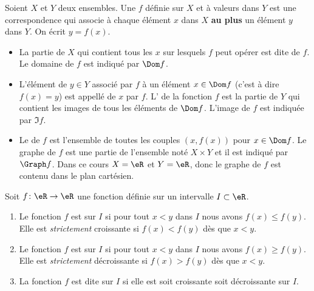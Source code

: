 \begin{definition}
  Soient $X$ et $Y$ deux ensembles. Une  $f$ définie sur $X$ et à valeurs dans $Y$ est une correspondence qui associe à chaque élément $x$ dans $X$ {\bf au plus} un élément $y$ dans $Y$. On écrit $y= f(x)$.
  \begin{itemize}
  \item La partie de $X$ qui contient tous les $x$ sur lesquels $f$ peut opérer est dite  de $f$. Le domaine de $f$ est indiqué par $\Dom f$.
  \item L'élément de $y\in Y$ associé par $f$ à un élément $x\in \Dom f$ (c'est à dire $f(x) = y$)  est appellé  de $x$ par $f$. L' de la fonction $f$ est la partie de $Y$ qui contient les images de tous les éléments de $\Dom f$. L'image de $f$ est indiquée par $\Im f$.
  \item Le  de $f$ est l'ensemble de toutes les couples $(x, f(x))$ pour $x\in \Dom f$. Le graphe de $f$ est une partie de l'ensemble noté $X\times Y$ et il est indiqué par $\Graph f$. Dans ce cours $X = \eR$ et $Y = \eR$, donc le graphe de $f$ est contenu dans le plan cartésien. 
  \end{itemize}
\end{definition}

\begin{definition}
    Soit \( f\colon \eR\to \eR\) une fonction définie sur un intervalle \( I\subset \eR\).
    \begin{enumerate}
        \item
            Le fonction \( f\) est  sur \( I\) si pour tout \( x<y\) dans \( I\) nous avons \( f(x)\leq f(y)\). Elle est \emph{strictement} croissante si \( f(x)<f(y)\) dès que \( x<y\).
        \item
            Le fonction \( f\) est  sur \( I\) si pour tout \( x<y\) dans \( I\) nous avons \( f(x)\geq f(y)\). Elle est \emph{strictement} décroissante si \( f(x)>f(y)\) dès que \( x<y\).
        \item
            La fonction \( f\) est dite  sur \( I\) si elle est soit croissante soit décroissante sur \( I\).
    \end{enumerate}
\end{definition}

